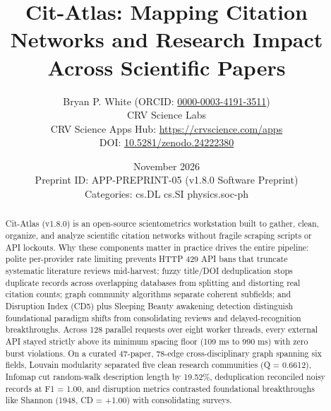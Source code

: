 \documentclass[10pt,letterpaper]{article}
\title{\textbf{Cit-Atlas: Mapping Citation Networks and Research Impact Across Scientific Papers}}
\author{Bryan P. White (ORCID: \href{https://orcid.org/0000-0003-4191-3511}{0000-0003-4191-3511}) \\ CRV Science Labs \\ \small CRV Science Apps Hub: \url{https://crvscience.com/apps} \\ \small DOI: \href{https://doi.org/10.5281/zenodo.24222380}{10.5281/zenodo.24222380}}
\date{November 2026 \\ \small Preprint ID: APP-PREPRINT-05 (v1.8.0 Software Preprint) \\ \small Categories: cs.DL \textbullet{} cs.SI \textbullet{} physics.soc-ph}
\begin{document}
\maketitle

\begin{abstract}
Cit-Atlas (v1.8.0) is an open-source scientometrics workstation built to gather, clean, organize, and analyze scientific citation networks without fragile scraping scripts or API lockouts. Why these components matter in practice drives the entire pipeline: polite per-provider rate limiting prevents HTTP 429 API bans that truncate systematic literature reviews mid-harvest; fuzzy title/DOI deduplication stops duplicate records across overlapping databases from splitting and distorting real citation counts; graph community algorithms separate coherent subfields; and Disruption Index (CD5) plus Sleeping Beauty awakening detection distinguish foundational paradigm shifts from consolidating reviews and delayed-recognition breakthroughs. Across 128 parallel requests over eight worker threads, every external API stayed strictly above its minimum spacing floor (109 ms to 990 ms) with zero burst violations. On a curated 47-paper, 78-edge cross-disciplinary graph spanning six fields, Louvain modularity separated five clean research communities (Q = 0.6612), Infomap cut random-walk description length by 19.52\%, deduplication reconciled noisy records at F1 = 1.00, and disruption metrics contrasted foundational breakthroughs like Shannon (1948, CD = +1.00) with consolidating surveys.
\end{abstract}
\end{document}
